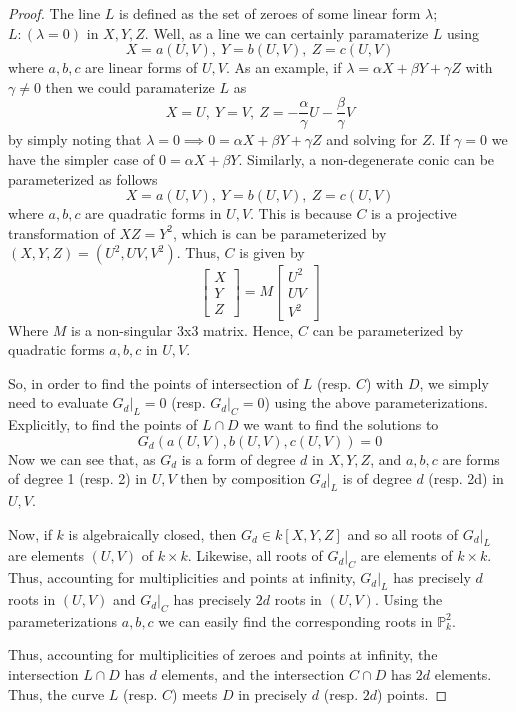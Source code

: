 \begin{proof}
The line $L$ is defined as the set of zeroes of some linear form $\lambda$; $L:(\lambda=0)$
in $X,Y,Z$. Well, as a line we can certainly paramaterize $L$ using 
\[
X=a(U,V),~Y=b(U,V),~Z=c(U,V)
\]
where $a, b, c$ are linear forms of $U,V$. As an example, if $\lambda = \alpha X + \beta Y + \gamma Z$
with $\gamma \ne 0$ then we could paramaterize $L$ as
\[
X = U,~Y=V,~Z=-\frac{\alpha}{\gamma}U - \frac{\beta}{\gamma}V
\]
by simply noting that $\lambda = 0 \implies 0 = \alpha X + \beta Y + \gamma Z$ and solving
for $Z$. If $\gamma = 0$ we have the simpler case of $0 = \alpha X + \beta Y$.
Similarly, a non-degenerate conic can be parameterized as follows
\[
X=a(U,V),~Y=b(U,V),~Z=c(U,V)
\]
where $a,b,c$ are quadratic forms in $U,V$. This is because $C$ is a projective
transformation of $XZ=Y^2$, which is can be parameterized by $(X,Y,Z) = (U^2,UV,V^2)$.
Thus, $C$ is given by 
\[
\begin{bmatrix}
X\\
Y\\
Z
\end{bmatrix}
=
M
\begin{bmatrix}
U^2\\
UV\\
V^2
\end{bmatrix}
\]
Where $M$ is a non-singular 3x3 matrix. Hence, $C$ can be parameterized by
quadratic forms $a, b, c$ in $U,V$.

So, in order to find the points of intersection of $L$ (resp. $C$) with $D$,
we simply need to evaluate $G_d|_L=0$ (resp. $G_d|_C=0$) using the above parameterizations.
Explicitly, to find the points of $L \cap D$ we want to find the solutions to
\[
	G_d(a(U,V),b(U,V),c(U,V)) = 0
\]
Now we can see that, as $G_d$ is a form of degree $d$ in $X,Y,Z$, and $a,b,c$ are forms
of degree 1 (resp. 2) in $U,V$ then by composition $G_d|_L$ is of degree $d$ (resp. 2d) in $U,V$.

Now, if $k$ is algebraically closed, then $G_d \in k[X,Y,Z]$ and so all roots of $G_d|_L$ are
elements $(U, V)$ of $k \times k$. Likewise, all roots of $G_d|_C$ are elements of $k \times k$.
Thus, accounting for multiplicities and points at infinity, $G_d|_L$ has precisely $d$ roots in 
$(U, V)$ and $G_d|_C$ has precisely $2d$ roots in $(U, V)$.
Using the parameterizations $a, b, c$ we can easily find the corresponding
roots in $\mathbb{P}^2_k$.

Thus, accounting for multiplicities of zeroes and points at infinity,
the intersection $L \cap D$ has $d$ elements, and the intersection
$C \cap D$ has $2d$ elements. Thus, the curve $L$ (resp. $C$) meets $D$ in
precisely $d$ (resp. $2d$) points.
\end{proof}
